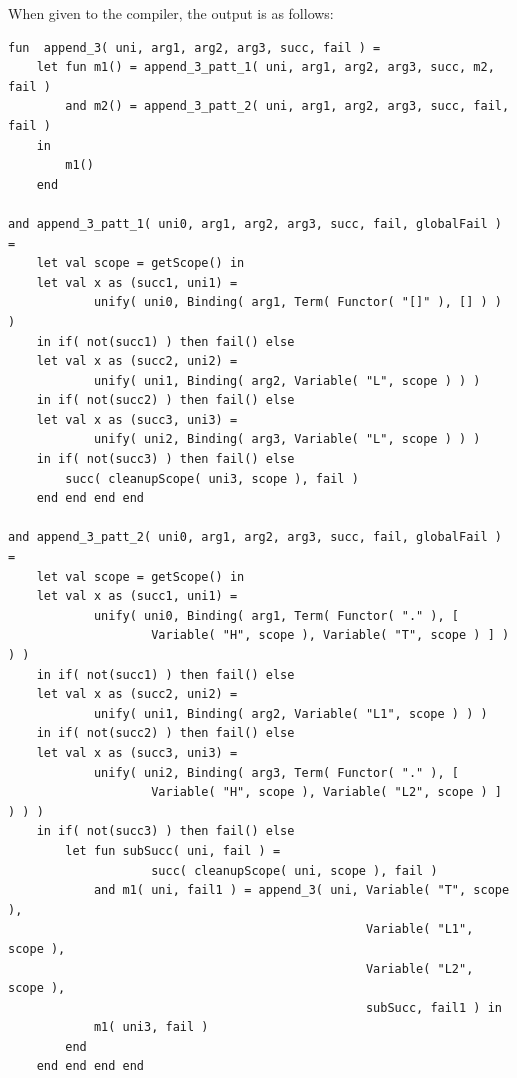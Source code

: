 \documentclass[12pt]{article}
\begin{document}
When given to the compiler, the output is as follows:

\begin{verbatim}
fun  append_3( uni, arg1, arg2, arg3, succ, fail ) = 
    let fun m1() = append_3_patt_1( uni, arg1, arg2, arg3, succ, m2, fail )
        and m2() = append_3_patt_2( uni, arg1, arg2, arg3, succ, fail, fail ) 
    in
        m1()
    end

and append_3_patt_1( uni0, arg1, arg2, arg3, succ, fail, globalFail ) = 
    let val scope = getScope() in
    let val x as (succ1, uni1) = 
            unify( uni0, Binding( arg1, Term( Functor( "[]" ), [] ) ) )
    in if( not(succ1) ) then fail() else
    let val x as (succ2, uni2) = 
            unify( uni1, Binding( arg2, Variable( "L", scope ) ) )
    in if( not(succ2) ) then fail() else
    let val x as (succ3, uni3) = 
            unify( uni2, Binding( arg3, Variable( "L", scope ) ) )
    in if( not(succ3) ) then fail() else
        succ( cleanupScope( uni3, scope ), fail )
    end end end end

and append_3_patt_2( uni0, arg1, arg2, arg3, succ, fail, globalFail ) = 
    let val scope = getScope() in
    let val x as (succ1, uni1) = 
            unify( uni0, Binding( arg1, Term( Functor( "." ), [ 
                    Variable( "H", scope ), Variable( "T", scope ) ] ) ) )
    in if( not(succ1) ) then fail() else
    let val x as (succ2, uni2) = 
            unify( uni1, Binding( arg2, Variable( "L1", scope ) ) )
    in if( not(succ2) ) then fail() else
    let val x as (succ3, uni3) = 
            unify( uni2, Binding( arg3, Term( Functor( "." ), [ 
                    Variable( "H", scope ), Variable( "L2", scope ) ] ) ) )
    in if( not(succ3) ) then fail() else
        let fun subSucc( uni, fail ) = 
                    succ( cleanupScope( uni, scope ), fail )
            and m1( uni, fail1 ) = append_3( uni, Variable( "T", scope ), 
                                                  Variable( "L1", scope ), 
                                                  Variable( "L2", scope ), 
                                                  subSucc, fail1 ) in
            m1( uni3, fail )
        end
    end end end end
\end{verbatim}

\end{document}
